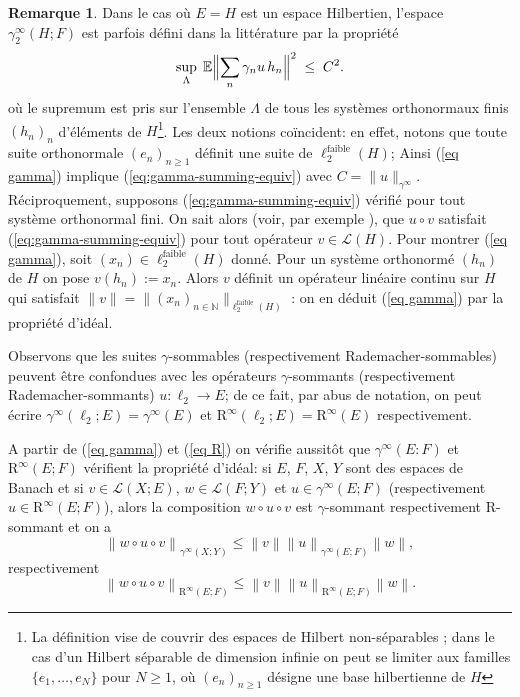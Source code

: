 \documentclass{smfart}
\theoremstyle{plain}
\theoremstyle{definition}
\newtheorem*{remark}{Remarque}
\newcommand{\EE}{\mathbb E}
\newcommand\N{{\mathbb N}}
\newcommand {\FAIBLE} {\text{faible}}
\newcommand{\err}{\mathrm{R}}
\newcommand {\norm}[1] {\| #1 \|}               %
\newcommand {\Bignorm}[1]{\Bigl\| #1 \Bigr\|}
\newcommand {\BOUNDED} {{\mathcal L}}
\begin{document}
\bigskip

\begin{remark}
  Dans le cas où $E=H$ est un espace Hilbertien, l'espace
  $\gamma_2^\infty(H; F)$ est parfois défini dans la littérature par
  la propriété
\begin{equation}  \label{eq:gamma-summing-equiv}
    \sup_{\Lambda}\;   \EE \Bignorm{\sum_{n} \gamma_n u \, h_n }^2 \; \leq \; C^2.
\end{equation}
où le supremum est pris sur l'ensemble $\Lambda$ de tous les systèmes orthonormaux 
finis $(h_n)_n$ d'éléments de $H$\footnote{La définition vise de couvrir des
  espaces de Hilbert non-séparables ; dans le cas d'un Hilbert séparable de dimension infinie
  on peut se limiter aux familles $\{e_1,\dots,e_N\}$ pour $N\ge 1$, o\`u $(e_n)_{n\ge 1}$ désigne une base hilbertienne de $H$}.
%
Les deux notions coïncident: en
effet, notons que toute suite orthonormale $(e_n)_{n\ge 1}$ définit une suite
de $\ell_2^\FAIBLE(H)$; Ainsi (\ref{eq gamma}) implique
(\ref{eq:gamma-summing-equiv}) avec $C = \norm{ u
}_{\gamma^\infty}$. Réciproquement, supposons
(\ref{eq:gamma-summing-equiv}) vérifié pour tout système orthonormal fini.  On
sait alors (voir, par exemple \cite[Théorème 6.2]{jvn}), que $u \circ
v$ satisfait (\ref{eq:gamma-summing-equiv}) pour tout opérateur $v \in
\BOUNDED(H)$. Pour montrer (\ref{eq gamma}), soit $(x_n) \in
\ell_2^\FAIBLE(H)$ donné. Pour un système orthonormé $(h_n)$ de $H$ on
pose $v(h_n) := x_n$. Alors $v$ définit un opérateur linéaire continu
sur $H$ qui satisfait $\norm{v} = \norm{(x_n)_{n
    \in\N}}_{\ell_2^\FAIBLE(H)}$ : on en déduit (\ref{eq gamma}) par
la propriété d'idéal.
\end{remark}


Observons que les suites $\gamma$-sommables (respectivement
Rademacher-sommables) peuvent être confondues avec les opérateurs
$\gamma$-sommants (respectivement Rademacher-sommants) $u: \ell_2 \to
E$; de ce fait, par abus de notation, on peut écrire
$\gamma^\infty(\ell_2; E) = \gamma^\infty(E)$ et 
$\err^\infty(\ell_2; E) = \err^\infty(E)$ respectivement.

\medskip

A partir de (\ref{eq gamma}) et (\ref{eq R}) on vérifie aussitôt que
$\gamma^\infty(E: F)$ et $\err^\infty(E; F)$ vérifient la propriété
d'idéal: si $E$, $F$, $X$, $Y$ sont des espaces de Banach et si
$v\in\mathcal{L}\left(X;E\right)$, $w\in\mathcal{L}\left(F;Y\right)$
et $u \in \gamma^\infty(E; F)$ (respectivement $u\in
\err^\infty\left(E;F\right)$), alors la composition $w\circ u\circ v$
est $\gamma$-sommant respectivement $\err$-sommant et on a
\[
\left\|w\circ u\circ  v\right\|_{\gamma^\infty\left(X;Y \right)}
\leq
\left\|v\right\|\left\|u\right\|_{\gamma^\infty\left(E;F\right)}\left\|w\right\|,
\]
respectivement 
\[
\left\|w\circ u\circ  v\right\|_{\err^\infty\left(E;F\right)} 
\leq
\left\|v\right\|\left\|u\right\|_{\err^\infty\left(E;F\right)}\left\|w\right\|.
\]
\end{document}
